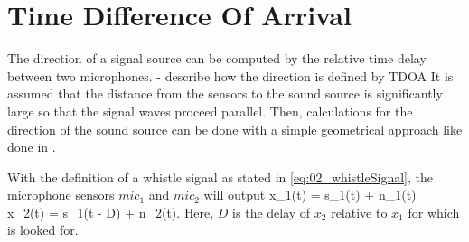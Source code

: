 \section{Time Difference Of Arrival}

The direction of a signal source can be computed by the relative time delay between
two microphones.
- describe how the direction is defined by TDOA
It is assumed that the distance from the sensors to the sound source is
significantly large so that the signal waves proceed parallel.
Then, calculations for the direction of the sound source can be done with a simple
geometrical approach like done in \cite{Valin_Michaud}.

With the definition of a whistle signal as stated in \ref{eq:02_whistleSignal},
the microphone sensors $mic_1$ and $mic_2$ will output
\subbea
    x_1(t) = s_1(t) + n_1(t)\\
    x_2(t) = \alpha * s_1(t - D) + n_2(t).
    \label{eq:02_sensorOutputsTimeDomain}
\subeea
Here, $D$ is the delay of $x_2$ relative to $x_1$ for which is looked for.